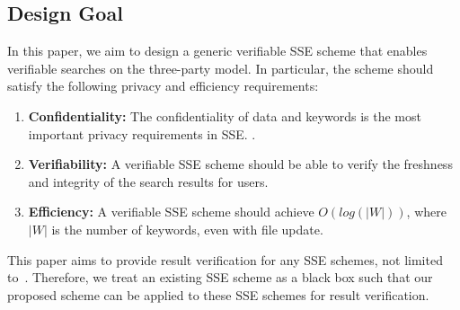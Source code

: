 \subsection{Design Goal}
  In this paper, we aim to design a generic verifiable SSE scheme that enables verifiable searches on the three-party model. In particular, the scheme should satisfy the following privacy and efficiency requirements:
 

  \begin{enumerate}
    \item \textbf{Confidentiality:} The confidentiality of data and keywords is the most important privacy requirements in SSE. .
    \item \textbf{Verifiability:} A verifiable SSE scheme should be able to verify the freshness and integrity of the search results for users.
    \item \textbf{Efficiency:} A verifiable SSE scheme should achieve  $O(log(|W|))$, where $|W|$ is the number of keywords, even with file update. 
  \end{enumerate}


  This paper aims to provide result verification for any SSE schemes,  not limited to~\cite{stefanov2014practical,cash2014dynamic,kamara2012dynamic}. Therefore, we treat an existing SSE scheme as a black box such that our proposed scheme can be applied to these SSE schemes for result verification. %

